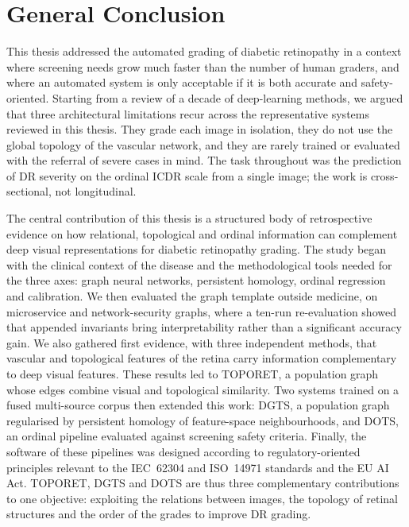 \chapter*{General Conclusion}
\label{ch:conclusion}

This thesis addressed the automated grading of diabetic retinopathy in a context where
screening needs grow much faster than the number of human graders, and where an automated
system is only acceptable if it is both accurate and safety-oriented. Starting from a
review of a decade of deep-learning methods, we argued that three architectural
limitations recur across the representative systems reviewed in this thesis. They grade
each image in isolation, they do not use the global topology of the vascular network, and
they are rarely trained or evaluated with the referral of severe cases in mind. The task
throughout was the prediction of DR severity on the ordinal ICDR scale from a single
image; the work is cross-sectional, not longitudinal.

The central contribution of this thesis is a structured body of retrospective evidence on
how relational, topological and ordinal information can complement deep visual
representations for diabetic retinopathy grading.
The study began with the clinical context of the disease and the methodological tools
needed for the three axes: graph neural networks, persistent homology, ordinal regression
and calibration. We then evaluated the graph template outside medicine, on microservice
and network-security graphs, where a ten-run re-evaluation showed that appended invariants
bring interpretability rather than a significant accuracy gain. We also gathered first
evidence, with three independent methods, that vascular and topological features of the
retina carry information complementary to deep visual features. These results led to
TOPORET, a population graph whose edges combine visual and topological similarity. Two systems trained on a fused multi-source corpus then extended this work:
DGTS, a population graph regularised by persistent homology of feature-space
neighbourhoods, and DOTS, an ordinal pipeline evaluated against screening safety criteria.
Finally, the software of these pipelines was designed according to regulatory-oriented
principles relevant to the IEC~62304 and ISO~14971 standards and the EU AI Act. TOPORET,
DGTS and DOTS are thus three complementary contributions to one objective: exploiting the
relations between images, the topology of retinal structures and the order of the grades
to improve DR grading.

